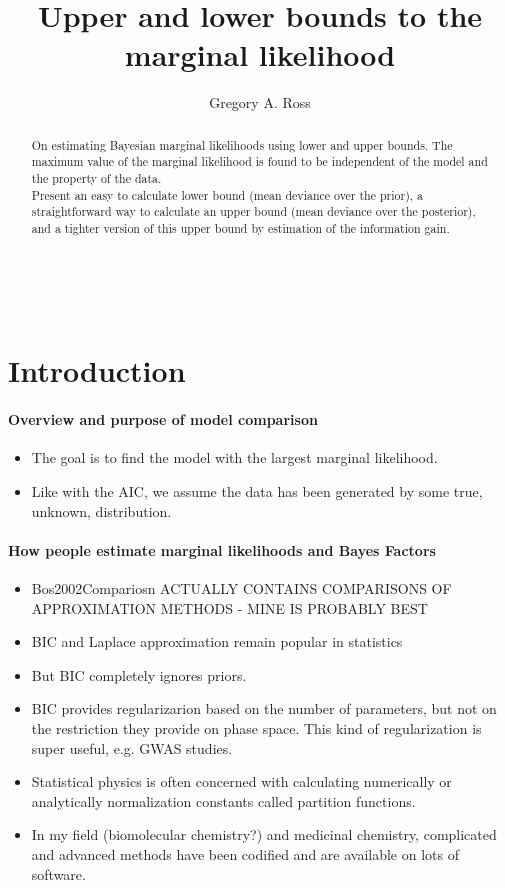 \documentclass[10pt,a4paper]{article}
\author{Gregory A. Ross}
\title{Upper and lower bounds to the marginal likelihood}
\begin{document}
\newcommand{\myrightarrow}[1]{\xrightarrow{\makebox[2em][c]{$\scriptstyle#1$}}}‌


\maketitle
\begin{abstract}
On estimating Bayesian marginal likelihoods using lower and upper bounds. The maximum value of the marginal likelihood is found to be independent of the model and the property of the data.\\

Present an easy to calculate lower bound (mean deviance over the prior), a straightforward way to calculate an upper bound (mean deviance over the posterior), and a tighter version of this upper bound by estimation of the information gain. 
\end{abstract}

\section{Introduction}



\paragraph{Overview and purpose of model comparison}
\begin{itemize}
\item The goal is to find the model with the largest marginal likelihood.
\item Like with the AIC, we assume the data has been generated by some true, unknown, distribution.
\end{itemize}

\paragraph{How people estimate marginal likelihoods and Bayes Factors}
\begin{itemize}
\item Bos2002Compariosn ACTUALLY CONTAINS COMPARISONS OF APPROXIMATION METHODS - MINE IS PROBABLY BEST
\item BIC and Laplace approximation remain popular in statistics
\item But BIC completely ignores priors. 
\item BIC provides regularizarion based on the number of parameters, but not on the restriction they provide on phase space. This kind of regularization is super useful, e.g. GWAS studies.
\item Statistical physics is often concerned with calculating numerically or analytically normalization constants called partition functions.
\item In my field (biomolecular chemistry?) and medicinal chemistry, complicated and advanced methods have been codified and are available on lots of software.
\end{itemize}
\end{document}
